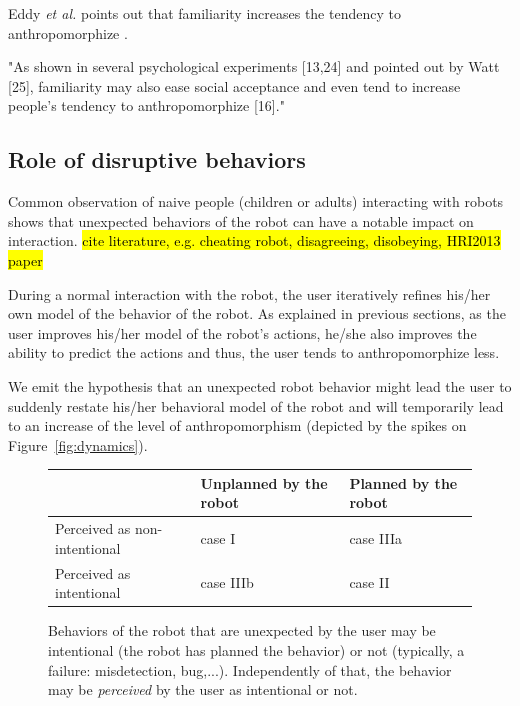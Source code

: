 \documentclass{frontiersSCNS} %
\begin{document}
Eddy \textit{et al.} points out that familiarity increases the tendency to
anthropomorphize \cite{eddy_attribution_1993}.

"As shown in several psychological experiments [13,24] and pointed out by Watt
[25], familiarity may also ease social acceptance and even tend to increase
people's tendency to anthropomorphize [16]." \cite{duffy_anthropomorphism_2003}


\subsection{Role of disruptive behaviors}
\label{sec:disruptive}

Common observation of naive people (children or adults) interacting with robots
shows that unexpected behaviors of the robot can have a notable impact on
interaction. \hl{cite literature, e.g. cheating robot, disagreeing, disobeying,
HRI2013 paper}

During a normal interaction with the robot, the user iteratively refines his/her
own model of the behavior of the robot. As explained in previous sections, as
the user improves his/her model of the robot's actions, he/she also improves the
ability to predict the actions and thus, the user tends to anthropomorphize
less.

We emit the hypothesis that an unexpected robot behavior might lead the user to
suddenly restate his/her behavioral model of the robot and will temporarily lead
to an increase of the level of anthropomorphism (depicted by the spikes on
Figure~\ref{fig:dynamics}).



\begin{figure}\footnotesize
    \begin{tabular}{  >{\centering\arraybackslash}m{2cm} | >{\centering\arraybackslash}m{2cm} | >{\centering\arraybackslash}m{2cm} }
     & Unplanned by the robot & Planned by the robot \\ \hline
    Perceived as non-intentional & case I  & case IIIa  \\ \hline
    Perceived as intentional &  case IIIb & case II 
    \end{tabular}
\caption{
    Behaviors of the robot that are unexpected by the user may be intentional
    (the robot has planned the behavior) or not (typically, a failure:
    misdetection, bug,...). Independently of that, the behavior may be
    \emph{perceived} by the user as intentional or not.}
\label{fig:perceptionUnexpectedBehavior}
\end{figure}
\end{document}

